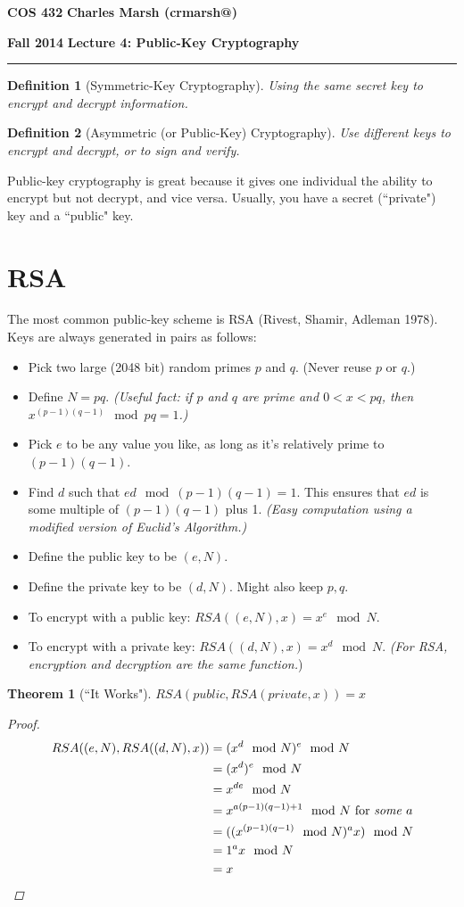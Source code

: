 \documentclass[12pt]{article}
\makeatletter
\newtheorem{thm}{Theorem}
\newtheorem*{mydef}{Definition}
\newcommand{\myheader}[4]
{\vspace*{-0.5in}
\noindent
{#1} \hfill {#3}

\noindent
{#2} \hfill {#4}

\noindent
\rule[8pt]{\textwidth}{1pt}

\vspace{1ex} 
}  %
\newcommand{\myalgsheader}[0]
{\myheader
{ {\bf{COS 432}} }
{ {\bf{Fall 2014}} }
{ {\bf{Charles Marsh (crmarsh@)}} }
{ {\bf{Lecture 4: Public-Key Cryptography}} }
}
\makeatother
\begin{document}
\myalgsheader

\pagestyle{plain}

\begin{mydef}[Symmetric-Key Cryptography]
Using the same \textit{secret} key to encrypt and decrypt information.
\end{mydef}

\begin{mydef}[Asymmetric (or Public-Key) Cryptography]
Use different keys to encrypt and decrypt, or to sign and verify.
\end{mydef}

Public-key cryptography is great because it gives one individual the ability to encrypt but not decrypt, and vice versa. Usually, you have a secret (``private") key and a ``public" key. 

\section*{RSA}

The most common public-key scheme is RSA (Rivest, Shamir, Adleman 1978). Keys are always generated in pairs as follows:
\begin{itemize}
\item Pick two large (2048 bit) random primes $p$ and $q$. (Never reuse $p$ or $q$.)
\item Define $N = pq$. \textit{(Useful fact: if $p$ and $q$ are prime and $0 < x < pq$, then $x^{(p-1)(q-1)} \mod pq = 1$.)}
\item Pick $e$ to be any value you like, as long as it's relatively prime to $(p-1)(q-1)$.
\item Find $d$ such that $ed \mod (p-1)(q-1) = 1$. This ensures that $ed$ is some multiple of $(p-1)(q-1)$ plus 1. \textit{(Easy computation using a modified version of Euclid's Algorithm.)}
\item Define the public key to be $(e, N)$.
\item Define the private key to be $(d, N)$. Might also keep $p, q$.
\item To encrypt with a public key: $RSA((e, N), x) = x^e \mod N$.
\item To encrypt with a private key: $RSA((d, N), x) = x^d \mod N$. \textit{(For RSA, encryption and decryption are the same function.})
\end{itemize}

\begin{thm}[``It Works"]
$RSA(public, RSA(private, x)) = x$
\begin{proof}
\begin{align*}
RSA((e, N), RSA((d, N), x)) &= (x^d \mod N)^e \mod N \\
&= (x^d)^e \mod N \\
&= x^{de} \mod N \\
&= x^{a(p-1)(q-1)+1} \mod N \text{ for \textit{some} $a$} \\
&= ((x^{(p-1)(q-1)} \mod N)^a x) \mod N \\
&= 1^a x \mod N \\
&= x
\end{align*}
\end{proof}
\end{thm}
\end{document}
